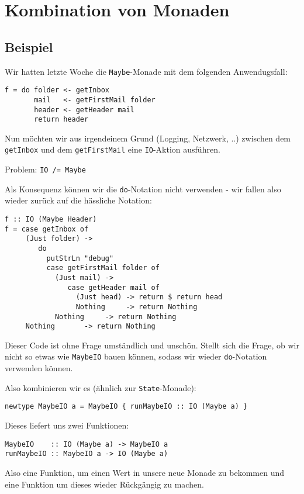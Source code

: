 \documentclass{beamer}
\begin{document}
\section{Kombination von Monaden}

\subsection{Beispiel}
\begin{frame}[fragile]
Wir hatten letzte Woche die \texttt{Maybe}-Monade mit dem folgenden Anwendugsfall: \bigskip

\begin{verbatim}
f = do folder <- getInbox
       mail   <- getFirstMail folder
       header <- getHeader mail
       return header
\end{verbatim}
\pause
Nun möchten wir aus irgendeinem Grund (Logging, Netzwerk, ..) zwischen dem \texttt{getInbox} und dem \texttt{getFirstMail} eine \texttt{IO}-Aktion ausführen.\\
\bigskip \pause

Problem: \texttt{IO /= Maybe}\bigskip

\pause
Als Konsequenz können wir die \texttt{do}-Notation nicht verwenden - wir fallen also wieder zurück auf die hässliche Notation:
\end{frame}

\begin{frame}[fragile]
\begin{verbatim}
f :: IO (Maybe Header)
f = case getInbox of
     (Just folder) -> 
        do
          putStrLn "debug"
          case getFirstMail folder of
            (Just mail) -> 
               case getHeader mail of
                 (Just head) -> return $ return head
                 Nothing     -> return Nothing
            Nothing     -> return Nothing
     Nothing       -> return Nothing
\end{verbatim}
\end{frame}

\begin{frame}[fragile]
Dieser Code ist ohne Frage umständlich und unschön. Stellt sich die Frage, ob wir nicht so etwas wie \texttt{MaybeIO} bauen können, sodass wir wieder \texttt{do}-Notation verwenden können.\bigskip

\pause
Also kombinieren wir es (ähnlich zur \texttt{State}-Monade):

\begin{verbatim}
newtype MaybeIO a = MaybeIO { runMaybeIO :: IO (Maybe a) }
\end{verbatim}

\pause
Dieses liefert uns zwei Funktionen:

\begin{verbatim}
MaybeIO    :: IO (Maybe a) -> MaybeIO a
runMaybeIO :: MaybeIO a -> IO (Maybe a)
\end{verbatim}

Also eine Funktion, um einen Wert in unsere neue Monade zu bekommen und eine Funktion um dieses wieder Rückgängig zu machen.
\end{frame}
\end{document}
